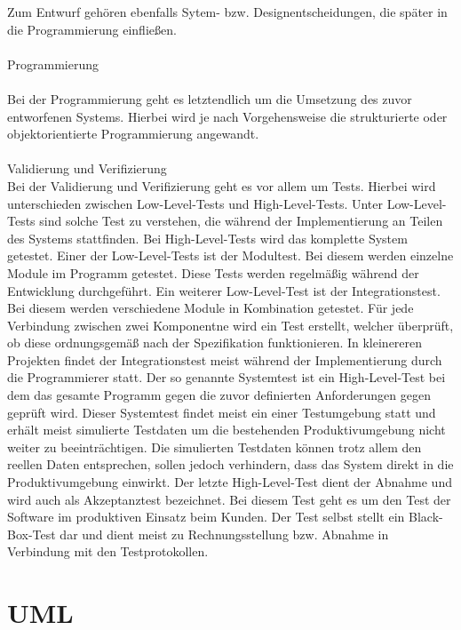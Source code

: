 Zum Entwurf gehören ebenfalls Sytem- bzw. Designentscheidungen, die später in die Programmierung einfließen.
\\
\\
Programmierung\\
\\
Bei der Programmierung geht es letztendlich um die Umsetzung des zuvor entworfenen Systems. Hierbei wird je nach Vorgehensweise die strukturierte oder objektorientierte Programmierung angewandt.
\\
\\
Validierung und Verifizierung
\\
Bei der Validierung  und Verifizierung geht es vor allem um Tests. Hierbei wird unterschieden zwischen Low-Level-Tests und High-Level-Tests. Unter Low-Level-Tests sind solche Test zu verstehen, die während der Implementierung an Teilen des Systems stattfinden. Bei High-Level-Tests wird das komplette System getestet. Einer der Low-Level-Tests ist der Modultest. Bei diesem werden einzelne Module im Programm getestet.  Diese Tests werden regelmäßig während der Entwicklung durchgeführt. Ein weiterer Low-Level-Test ist der Integrationstest. Bei diesem werden verschiedene Module in Kombination getestet. Für jede Verbindung zwischen zwei Komponentne wird ein Test erstellt, welcher überprüft, ob diese ordnungsgemäß nach der Spezifikation funktionieren. In kleinereren Projekten findet der Integrationstest meist während der Implementierung durch die Programmierer statt.
Der so genannte Systemtest ist ein High-Level-Test bei dem das gesamte Programm gegen die zuvor definierten Anforderungen gegen geprüft wird. Dieser Systemtest findet meist ein einer Testumgebung statt und erhält meist simulierte Testdaten um die bestehenden Produktivumgebung nicht weiter zu beeinträchtigen. Die simulierten Testdaten können trotz allem den reellen Daten entsprechen, sollen jedoch verhindern, dass das System direkt in die Produktivumgebung einwirkt.
Der letzte High-Level-Test dient der Abnahme und wird auch als Akzeptanztest bezeichnet. Bei diesem Test geht es um den Test der Software im produktiven Einsatz beim Kunden. Der Test selbst stellt ein Black-Box-Test dar und dient meist zu Rechnungsstellung bzw. Abnahme in Verbindung mit den Testprotokollen.

\section{UML}
\label{sec:uml}

